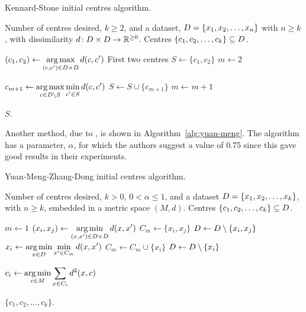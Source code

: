 \begin{algorithm}[h]
  \caption{Kennard-Stone initial centres algorithm.}
  \label{alg:kennard-stone}

  \begin{algorithmic}
    \Require Number of centres desired, $k \geq 2$, and a dataset, $D =
             \{x_1,x_2,\dotsc,x_n\}$ with $n \geq k$, with dissimilarity
             $d \colon D \times D \to \mathbb{R}^{\geq 0}$.
    \Ensure Centres $\{c_1,c_2,\dotsc,c_k\} \subseteq D$.

    \State $\displaystyle (c_1,c_2) \gets
            \operatorname*{arg\,max}_{(c,c') \in D \times D} d(c,c')$ \Comment First
            two centres
    \State $S \gets \{c_1,c_2\}$
    \State $m \gets 2$

       \State $\displaystyle c_{m+1} \gets
               \argmax_{c \in \dset \setminus S}
               \min_{\raisebox{-.2em}{$\scriptstyle c' \in S$}} d(c,c')$
       \State $S \gets S \cup \{c_{m+1}\}$
       \State $m \gets m+1$
    \EndWhile

    \State \Return $S$.
  \end{algorithmic}
\end{algorithm}

Another method, due to \citet{yuan04initial}, is shown in
Algorithm~\ref{alg:yuan-meng}.  The algorithm has a parameter, $\alpha$, for
which the authors suggest a value of 0.75 since this gave good results in
their experiments.

\begin{algorithm}[h]
  \caption{Yuan-Meng-Zhang-Dong initial centres algorithm.}
  \label{alg:yuan-meng}

  \begin{algorithmic}
    \Require Number of centres desired, $k > 0$, $0 < \alpha \leq 1$, and a
             dataset $D = \{x_1,x_2,\dotsc,x_k\}$, with $n \geq k$,
             embedded in a metric space $(M,d)$.
    \Ensure Centres $\{c_1,c_2,\dotsc,c_k\} \subseteq D$.

    \State $m \gets 1$
       \State $\displaystyle (x_i,x_j) \gets
               \operatorname*{arg\,min}_{(x,x') \in D \times D} d(x,x')$
       \State $C_m \gets \{x_i,x_j\}$
       \State $D \gets D \setminus \{x_i,x_j\}$
          \State $\displaystyle x_i \gets
                  \operatorname*{arg\,min}_{x \in D} \min_{x' \in C_m} d(x,x')$
          \State $C_m \gets C_m \cup \{x_i\}$
          \State $D \gets D \setminus \{x_i\}$
       \EndWhile
    \EndWhile

       \State $\displaystyle c_i \gets
               \operatorname*{arg\,min}_{c \in M} \sum_{x \in C_i} d^2(x,c)$
    \EndFor

    \State \Return $\{c_1,c_2,\dotsc,c_k\}$.
  \end{algorithmic}
\end{algorithm}

